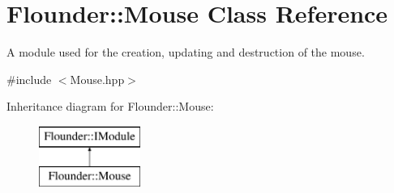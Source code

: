 \hypertarget{class_flounder_1_1_mouse}{}\section{Flounder\+:\+:Mouse Class Reference}
\label{class_flounder_1_1_mouse}


A module used for the creation, updating and destruction of the mouse.  




{\ttfamily \#include $<$Mouse.\+hpp$>$}

Inheritance diagram for Flounder\+:\+:Mouse\+:\begin{figure}[H]
\begin{center}
\leavevmode
\includegraphics[height=2.000000cm]{class_flounder_1_1_mouse}
\end{center}
\end{figure}
